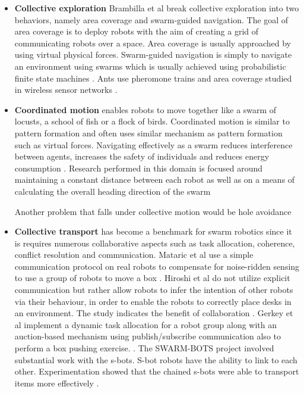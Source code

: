 \begin{itemize}
\item \textbf{Collective exploration}
Brambilla et al \cite{brambilla2013swarm} break collective exploration into two behaviors, namely area coverage and swarm-guided navigation. The goal of area coverage is to deploy robots with the aim of creating a grid of communicating robots over a space. Area coverage is usually approached by using virtual physical forces\cite{howard2002mobile,stirling2010energy}.
Swarm-guided navigation is simply to navigate an environment using swarms which is usually achieved using probabilistic finite state machines \cite{payton2001pheromone,ducatelle2011self}. Ants use pheromone trains and area coverage studied in wireless sensor networks \cite{brambilla2013swarm}. 
	
\item \textbf{Coordinated motion} 
enables robots to move together like a swarm of locusts, a school of fish or a flock of birds. Coordinated motion is similar to pattern formation and often uses similar mechanism as pattern formation such as virtual forces. Navigating effectively as a swarm reduces interference between agents, increases the safety of individuals and reduces energy consumption \cite{parrish2002self}. Research performed in this domain is focused around maintaining a constant distance between each robot as well as on a means of calculating the overall heading direction of the swarm \cite{turgut2008self,ferrante2010flocking,baldassarre2003evolving} 
	
Another problem that falls under collective motion would be hole avoidance \cite{trianni2006cooperative,trianni2005emergent} 

\item \textbf{Collective transport} has become a benchmark for swarm robotics since it is requires numerous collaborative aspects such as task allocation, coherence, conflict resolution and communication. Mataric et al use a simple communication protocol on real robots to compensate for noise-ridden sensing to use a group of robots to move a box \cite{mataric1995cooperative}. Hiroshi et al do not utilize explicit communication but rather allow robots to infer the intention of other robots via their behaviour, in order to enable the robots to correctly place desks in an environment. The study indicates the benefit of collaboration \cite{sugie1995placing}. Gerkey et al implement a dynamic task allocation for a robot group along with an auction-based mechanism using publish/subscribe communication also to perform a box pushing exercise. \cite{gerkey2002sold}. The SWARM-BOTS project involved substantial work with the s-bots. S-bot robots have the ability to link to each other. Experimentation showed that the chained s-bots were able to transport items more effectively \cite{gross2004group, dorigo2005swarm, ferrante2013socially}.

\end{itemize}
		

